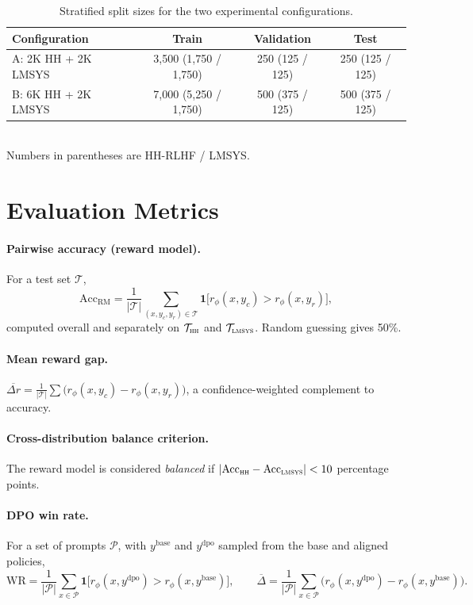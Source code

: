 \begin{table}[!htbp]
\centering
\caption[Split sizes]{Stratified split sizes for the two experimental configurations.}
\label{tab:splits}
\small
\begin{tabular}{@{}lccc@{}}
\toprule
\textbf{Configuration} & \textbf{Train} & \textbf{Validation} & \textbf{Test}\\
\midrule
A: 2K HH + 2K LMSYS & 3,500 (1,750 / 1,750) & 250 (125 / 125) & 250 (125 / 125)\\
B: 6K HH + 2K LMSYS & 7,000 (5,250 / 1,750) & 500 (375 / 125) & 500 (375 / 125)\\
\bottomrule
\end{tabular}\\[2pt]
{\footnotesize Numbers in parentheses are HH-RLHF / LMSYS.}
\end{table}

\section{Evaluation Metrics}
\label{sec:metrics}

\paragraph{Pairwise accuracy (reward model).} For a test set $\mathcal{T}$,
\begin{equation}
  \mathrm{Acc}_{\mathrm{RM}} = \frac{1}{|\mathcal{T}|}\sum_{(x,y_c,y_r)\in\mathcal{T}}\mathbf{1}\big[r_\phi(x,y_c) > r_\phi(x,y_r)\big],
\end{equation}
computed overall and separately on $\mathcal{T}_{\textsc{hh}}$ and $\mathcal{T}_{\textsc{lmsys}}$. Random guessing gives 50\%.

\paragraph{Mean reward gap.} $\overline{\Delta r} = \frac{1}{|\mathcal{T}|}\sum\big(r_\phi(x,y_c)-r_\phi(x,y_r)\big)$, a confidence-weighted complement to accuracy.

\paragraph{Cross-distribution balance criterion.} The reward model is considered \emph{balanced} if $|\mathrm{Acc}_{\textsc{hh}} - \mathrm{Acc}_{\textsc{lmsys}}| < 10$ percentage points.

\paragraph{DPO win rate.} For a set of prompts $\mathcal{P}$, with $y^{\text{base}}$ and $y^{\text{dpo}}$ sampled from the base and aligned policies,
\begin{equation}
  \mathrm{WR} = \frac{1}{|\mathcal{P}|}\sum_{x\in\mathcal{P}}\mathbf{1}\big[r_\phi(x,y^{\text{dpo}}) > r_\phi(x,y^{\text{base}})\big],\qquad \overline{\Delta} = \frac{1}{|\mathcal{P}|}\sum_{x\in\mathcal{P}}\big(r_\phi(x,y^{\text{dpo}}) - r_\phi(x,y^{\text{base}})\big).
\end{equation}

